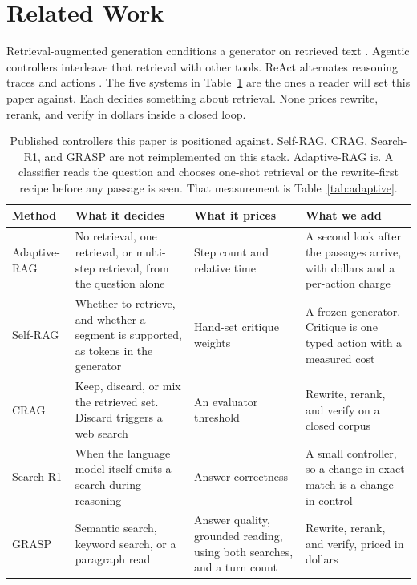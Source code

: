 \documentclass[letterpaper]{article} %
\begin{document}
\section{Related Work}
Retrieval-augmented generation conditions a generator on retrieved text \cite{lewis2020rag}. Agentic controllers interleave that retrieval with other tools. ReAct alternates reasoning traces and actions \cite{yao2023react}. The five systems in Table~\ref{tab:related} are the ones a reader will set this paper against. Each decides something about retrieval. None prices rewrite, rerank, and verify in dollars inside a closed loop.

\begin{table}[t]
\centering
\small
\begin{tabular}{p{}p{}p{}p{}}
\toprule
Method & What it decides & What it prices & What we add \\
\midrule
Adaptive-RAG \cite{jeong2024adaptive} & No retrieval, one retrieval, or multi-step retrieval, from the question alone & Step count and relative time & A second look after the passages arrive, with dollars and a per-action charge \\
Self-RAG \cite{asai2024selfrag} & Whether to retrieve, and whether a segment is supported, as tokens in the generator & Hand-set critique weights & A frozen generator. Critique is one typed action with a measured cost \\
CRAG \cite{yan2024crag} & Keep, discard, or mix the retrieved set. Discard triggers a web search & An evaluator threshold & Rewrite, rerank, and verify on a closed corpus \\
Search-R1 \cite{jin2025searchr1} & When the language model itself emits a search during reasoning & Answer correctness & A small controller, so a change in exact match is a change in control \\
GRASP \cite{gandhi2026grasp} & Semantic search, keyword search, or a paragraph read & Answer quality, grounded reading, using both searches, and a turn count & Rewrite, rerank, and verify, priced in dollars \\
\bottomrule
\end{tabular}
\caption{Published controllers this paper is positioned against. Self-RAG, CRAG, Search-R1, and GRASP are not reimplemented on this stack. Adaptive-RAG is. A classifier reads the question and chooses one-shot retrieval or the rewrite-first recipe before any passage is seen. That measurement is Table~\ref{tab:adaptive}.}
\label{tab:related}
\end{table}
\end{document}

